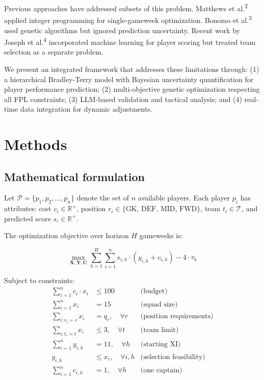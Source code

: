 \documentclass[10pt,a4paper]{article}
\begin{document}
Previous approaches have addressed subsets of this problem. Matthews et al.\textsuperscript{2} applied integer programming for single-gameweek optimization. Bonomo et al.\textsuperscript{3} used genetic algorithms but ignored prediction uncertainty. Recent work by Joseph et al.\textsuperscript{4} incorporated machine learning for player scoring but treated team selection as a separate problem.

We present an integrated framework that addresses these limitations through: (1) a hierarchical Bradley-Terry model with Bayesian uncertainty quantification for player performance prediction; (2) multi-objective genetic optimization respecting all FPL constraints; (3) LLM-based validation and tactical analysis; and (4) real-time data integration for dynamic adjustments.

\section*{Methods}

\subsection*{Mathematical formulation}

Let $\mathcal{P} = \{p_1, p_2, ..., p_n\}$ denote the set of $n$ available players. Each player $p_i$ has attributes: cost $c_i \in \mathbb{R}^+$, position $r_i \in \{\text{GK, DEF, MID, FWD}\}$, team $t_i \in \mathcal{T}$, and predicted score $s_i \in \mathbb{R}^+$.

The optimization objective over horizon $H$ gameweeks is:

\begin{equation}
\max_{\mathbf{X}, \mathbf{Y}, \mathbf{C}} \sum_{h=1}^{H} \sum_{i=1}^{n} s_{i,h} \cdot (y_{i,h} + c_{i,h}) - 4 \cdot \tau_h
\end{equation}

Subject to constraints:
\begin{align}
\sum_{i=1}^{n} c_i \cdot x_i &\leq 100 & \text{(budget)} \\
\sum_{i=1}^{n} x_i &= 15 & \text{(squad size)} \\
\sum_{i: r_i = r} x_i &= q_r, \quad \forall r & \text{(position requirements)} \\
\sum_{i: t_i = t} x_i &\leq 3, \quad \forall t & \text{(team limit)} \\
\sum_{i=1}^{n} y_{i,h} &= 11, \quad \forall h & \text{(starting XI)} \\
y_{i,h} &\leq x_i, \quad \forall i,h & \text{(selection feasibility)} \\
\sum_{i=1}^{n} c_{i,h} &= 1, \quad \forall h & \text{(one captain)}
\end{align}
\end{document}
